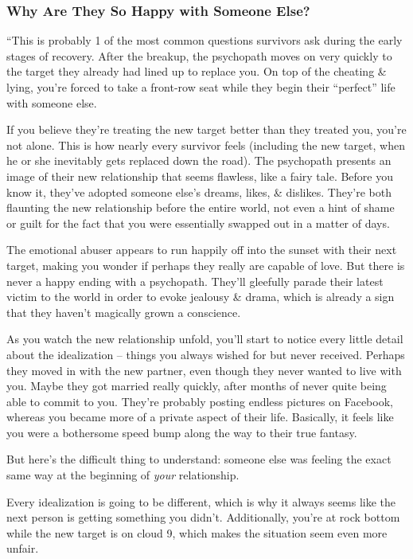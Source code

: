 \documentclass{article}
\numberwithin{equation}{section}
\begin{document}
\subsubsection{Why Are They So Happy with Someone Else?}
``This is probably 1 of the most common questions survivors ask during the early stages of recovery. After the breakup, the psychopath moves on very quickly to the target they already had lined up to replace you. On top of the cheating \& lying, you're forced to take a front-row seat while they begin their ``perfect'' life with someone else.

If you believe they're treating the new target better than they treated you, you're not alone. This is how nearly every survivor feels (including the new target, when he or she inevitably gets replaced down the road). The psychopath presents an image of their new relationship that seems flawless, like a fairy tale. Before you know it, they've adopted someone else's dreams, likes, \& dislikes. They're both flaunting the new relationship before the entire world, not even a hint of shame or guilt for the fact that you were essentially swapped out in a matter of days.

The emotional abuser appears to run happily off into the sunset with their next target, making you wonder if perhaps they really are capable of love. But there is never a happy ending with a psychopath. They'll gleefully parade their latest victim to the world in order to evoke jealousy \& drama, which is already a sign that they haven't magically grown a conscience.

As you watch the new relationship unfold, you'll start to notice every little detail about the idealization -- things you always wished for but never received. Perhaps they moved in with the new partner, even though they never wanted to live with you. Maybe they got married really quickly, after months of never quite being able to commit to you. They're probably posting endless pictures on Facebook, whereas you became more of a private aspect of their life. Basically, it feels like you were a bothersome speed bump along the way to their true fantasy.

But here's the difficult thing to understand: someone else was feeling the exact same way at the beginning of \textit{your} relationship.

Every idealization is going to be different, which is why it always seems like the next person is getting something you didn't. Additionally, you're at rock bottom while the new target is on cloud 9, which makes the situation seem even more unfair.
\end{document}
